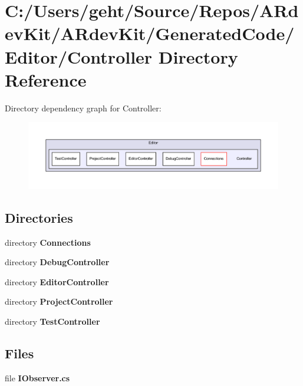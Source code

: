 \section{C\-:/\-Users/geht/\-Source/\-Repos/\-A\-Rdev\-Kit/\-A\-Rdev\-Kit/\-Generated\-Code/\-Editor/\-Controller Directory Reference}
\label{dir_e00763edb906f18d72e5b8bd24d64072}
Directory dependency graph for Controller\-:
\nopagebreak
\begin{figure}[H]
\begin{center}
\leavevmode
\includegraphics[width=350pt]{dir_e00763edb906f18d72e5b8bd24d64072_dep}
\end{center}
\end{figure}
\subsection*{Directories}
\begin{DoxyCompactItemize}
\item 
directory {\bf Connections}
\item 
directory {\bf Debug\-Controller}
\item 
directory {\bf Editor\-Controller}
\item 
directory {\bf Project\-Controller}
\item 
directory {\bf Test\-Controller}
\end{DoxyCompactItemize}
\subsection*{Files}
\begin{DoxyCompactItemize}
\item 
file {\bfseries I\-Observer.\-cs}
\end{DoxyCompactItemize}
